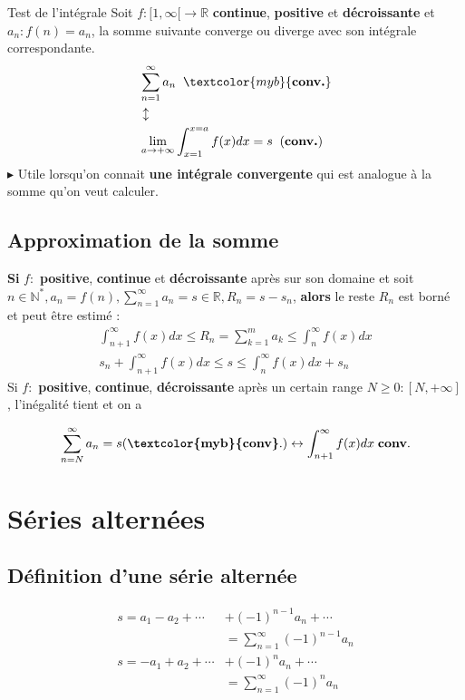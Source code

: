 \documentclass{report}
\begin{document}
\begin{multicols*}{3}
    \begin{theorem}{Test de l'intégrale}{}
    Soit $f : [1, \infty [ \rightarrow  \mathbb{R}$ 
    \textbf{continue}, \textbf{positive} et \textbf{décroissante} 
    et $a_n : f(n) = a_n$, la somme suivante converge ou diverge avec 
    son intégrale correspondante. 
    \begin{align*}
        &\sum_{n=1}^{\infty }a_n \;\; \textcolor{myb}{\textbf{conv.}} 
        \\
        & \updownarrow 
        \\
        &\lim\limits_{a \to +\infty }\int_{x=1}^{x = a}f(x)dx = s \;\; (\textbf{conv.})    
    \end{align*}
    $\blacktriangleright$ Utile lorsqu'on connait \textbf{une intégrale convergente} qui est 
    analogue à la somme qu'on veut calculer. 
    \end{theorem}


    \section{Approximation de la somme}
    \textbf{Si} $f:$ \textbf{positive}, \textbf{continue} et \textbf{décroissante} 
    après sur son domaine et soit $n \in \mathbb{N}^*, 
    a_n = f(n), \sum_{n=1}^{\infty }a_n = s \in \mathbb{R}, 
    R_n = s - s_n$, \textbf{alors} le reste $R_n$ est borné et peut être 
     estimé :
     \begin{align*}
        \int_{n+1}^{\infty }f(x)dx \leq R_n = \sum_{k=1}^{m} a_k 
        \leq \int_{n}^{\infty }f(x)dx
        \\ 
        s_n + \int_{n+1}^{\infty }f(x)dx \leq s  
        \leq \int_{n}^{\infty }f(x)dx + s_n
     \end{align*}
     Si $f:$ \textbf{positive}, \textbf{continue},  \textbf{décroissante} 
     après un certain range $N \geq 0 : [N, +\infty]$, l'inégalité tient et on a 
    
     \begin{align*}
         \sum_{n=N}^{\infty} a_n = s (\textbf{\textcolor{myb}{conv}}.) \leftrightarrow    
         \int_{n+1}^{\infty }f(x)dx  \; \textbf{conv}.   
     \end{align*}               

     \chapter{Séries alternées}

     \section{Définition d'une série alternée}
     \begin{align*}
         s=a_1-a_2+\cdots&+(-1)^{n-1}a_n +\cdots 
         \\
         &=\sum_{n=1}^\infty(-1)^{n-1}a_n
         \\
         s=-a_1+a_2 +\cdots&+(-1)^na_n+\cdots 
         \\
         &=\sum_{n=1}^\infty(-1)^na_n                
     \end{align*}               





\end{multicols*}
\end{document}
